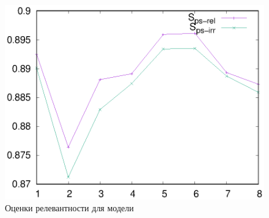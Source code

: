 \begin{figure}
    \centerline{\includegraphics[scale=0.8]{314-1_scores.eps}}
    \caption{Оценки релевантности для модели}\label{fig:ep-scores}
\end{figure}